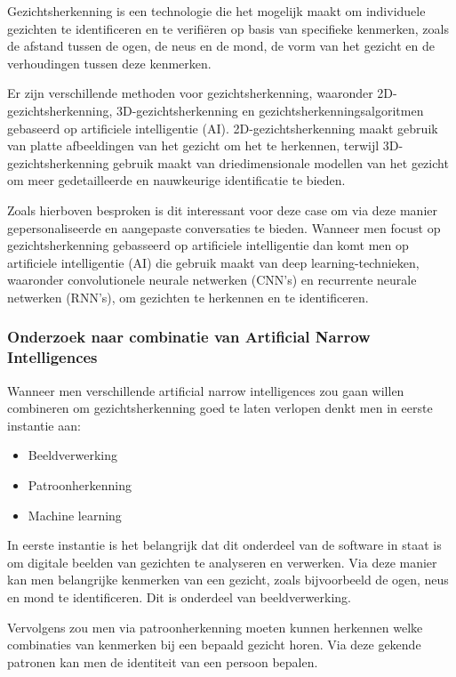 Gezichtsherkenning is een technologie die het mogelijk maakt om individuele gezichten te identificeren en te verifiëren op basis van specifieke kenmerken, zoals de afstand tussen de ogen, de neus en de mond, de vorm van het gezicht en de verhoudingen tussen deze kenmerken.

Er zijn verschillende methoden voor gezichtsherkenning, waaronder 2D-gezichtsherkenning, 3D-gezichtsherkenning en gezichtsherkenningsalgoritmen gebaseerd op artificiele intelligentie (AI). 2D-gezichtsherkenning maakt gebruik van platte afbeeldingen van het gezicht om het te herkennen, terwijl 3D-gezichtsherkenning gebruik maakt van driedimensionale modellen van het gezicht om meer gedetailleerde en nauwkeurige identificatie te bieden.

Zoals hierboven besproken is dit interessant voor deze case om via deze manier gepersonaliseerde en aangepaste conversaties te bieden. Wanneer men focust op gezichtsherkenning gebasseerd op artificiele intelligentie dan komt men op  artificiele intelligentie (AI) die gebruik maakt van deep learning-technieken, waaronder convolutionele neurale netwerken (CNN's) en recurrente neurale netwerken (RNN's), om gezichten te herkennen en te identificeren.

\subsubsection{Onderzoek naar combinatie van Artificial Narrow Intelligences}

Wanneer men verschillende artificial narrow intelligences zou gaan willen combineren om gezichtsherkenning goed te laten verlopen denkt men in eerste instantie aan:

\begin{itemize}
    \item Beeldverwerking
    \item Patroonherkenning
    \item Machine learning
\end{itemize}

In eerste instantie is het belangrijk dat dit onderdeel van de software in staat is om digitale beelden van gezichten te analyseren en verwerken. Via deze manier kan men belangrijke kenmerken van een gezicht, zoals bijvoorbeeld de ogen, neus en mond te identificeren. Dit is onderdeel van beeldverwerking.

Vervolgens zou men via patroonherkenning moeten kunnen herkennen welke combinaties van kenmerken bij een bepaald gezicht horen. Via deze gekende patronen kan men de identiteit van een persoon bepalen.

